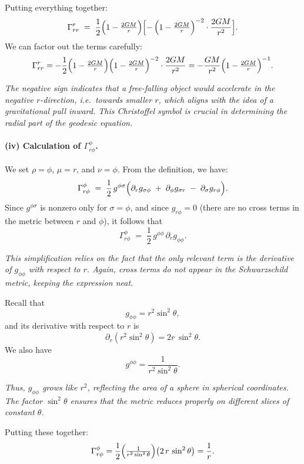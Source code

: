 \documentclass{article}
\begin{document}
\smallskip

\noindent
Putting everything together:
\[
\Gamma^r_{rr}
\;=\;
\frac{1}{2}
\Bigl(1 - \tfrac{2GM}{r}\Bigr)
\Bigl[
-\,\Bigl(1 - \tfrac{2GM}{r}\Bigr)^{-2}
\cdot
\frac{2GM}{r^2}
\Bigr].
\]
We can factor out the terms carefully:
\[
\Gamma^r_{rr}
=
-\frac{1}{2}
\Bigl(1 - \tfrac{2GM}{r}\Bigr)
\Bigl(1 - \tfrac{2GM}{r}\Bigr)^{-2}
\cdot
\frac{2GM}{r^2}
=
-\frac{GM}{r^2}
\Bigl(1 - \tfrac{2GM}{r}\Bigr)^{-1}.
\]

\emph{The negative sign indicates that a free-falling object would accelerate in the negative \(r\)-direction, i.e.\ towards smaller \(r\), which aligns with the idea of a gravitational pull inward. This Christoffel symbol is crucial in determining the radial part of the geodesic equation.}

\paragraph{(iv) Calculation of \(\Gamma^\phi_{r\phi}\).}
We set \(\rho = \phi\), \(\mu = r\), and \(\nu = \phi\). From the definition, we have:
\[
\Gamma^\phi_{r\phi}
\;=\;
\frac{1}{2}\,g^{\phi\sigma}
\Bigl(
\partial_r g_{\sigma \phi}
\;+\;
\partial_\phi g_{\sigma r}
\;-\;
\partial_\sigma g_{r \phi}
\Bigr).
\]
Since \(g^{\phi\sigma}\) is nonzero only for \(\sigma = \phi\), and since \(g_{r\phi} = 0\) (there are no cross terms in the metric between \(r\) and \(\phi\)), it follows that
\[
\Gamma^\phi_{r\phi}
\;=\;
\frac{1}{2} \, g^{\phi\phi}\,\partial_r g_{\phi\phi}.
\]

\emph{This simplification relies on the fact that the only relevant term is the derivative of \(g_{\phi\phi}\) with respect to \(r\). Again, cross terms do not appear in the Schwarzschild metric, keeping the expression neat.}

\smallskip

\noindent
Recall that
\[
g_{\phi\phi}
=
r^2 \sin^2\theta,
\]
and its derivative with respect to \(r\) is
\[
\partial_r (r^2 \sin^2\theta)
=
2r \,\sin^2\theta.
\]
We also have
\[
g^{\phi\phi}
=
\frac{1}{r^2 \sin^2\theta}.
\]

\emph{Thus, \(g_{\phi\phi}\) grows like \(r^2\), reflecting the area of a sphere in spherical coordinates. The factor \(\sin^2\theta\) ensures that the metric reduces properly on different slices of constant \(\theta\).}

\smallskip

\noindent
Putting these together:
\[
\Gamma^\phi_{r\phi}
=
\frac{1}{2}
\Bigl(\tfrac{1}{r^2 \sin^2\theta}\Bigr)
\bigl(2\,r\,\sin^2\theta\bigr)
=
\frac{1}{r}.
\]
\end{document}
